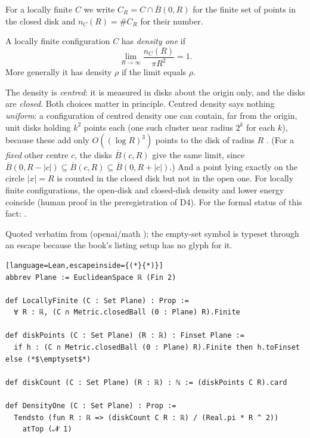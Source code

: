 For a locally finite $C$ we write $C_R = C\cap\overline B(0,R)$ for the finite set of points in the closed disk and
$n_C(R)=\#C_R$ for their number.

\begin{definition}\label{def:density}
A locally finite configuration $C$ has \emph{density one} if
\[
  \lim_{R\to\infty}\frac{n_C(R)}{\pi R^2}=1 .
\]
More generally it has density $\rho$ if the limit equals $\rho$.
\end{definition}

The density is \emph{centred}: it is measured in disks about the origin only, and the disks are \emph{closed}. Both
choices matter in principle. Centred density says nothing \emph{uniform}: a configuration of centred density one can
contain, far from the origin, unit disks holding $k^2$ points each (one such cluster near radius $2^k$ for each $k$),
because these add only $O((\log R)^3)$ points to the disk of radius $R$ \tierC{}. (For a \emph{fixed} other centre $c$,
the disks $\overline B(c,R)$ give the same limit, since
$\overline B(0,R-|c|)\subseteq\overline B(c,R)\subseteq\overline B(0,R+|c|)$.) And a point lying exactly on the circle $|x|=R$ is counted in the closed disk but not in the open
one. For locally finite configurations, the open-disk and closed-disk density and lower energy coincide
\tierC{} (human proof in the preregistration of D4). For the formal status of this fact: \DFourStatus.

\begin{leanbox}
Quoted verbatim from  (openai/math ); the
empty-set symbol is typeset through an escape because the book's listing setup has no glyph for it.
\begin{lstlisting}[language=Lean,escapeinside={(*}{*)}]
abbrev Plane := EuclideanSpace ℝ (Fin 2)

def LocallyFinite (C : Set Plane) : Prop :=
  ∀ R : ℝ, (C ∩ Metric.closedBall (0 : Plane) R).Finite

def diskPoints (C : Set Plane) (R : ℝ) : Finset Plane :=
  if h : (C ∩ Metric.closedBall (0 : Plane) R).Finite then h.toFinset else (*$\emptyset$*)

def diskCount (C : Set Plane) (R : ℝ) : ℕ := (diskPoints C R).card

def DensityOne (C : Set Plane) : Prop :=
  Tendsto (fun R : ℝ => (diskCount C R : ℝ) / (Real.pi * R ^ 2))
    atTop (𝓝 1)
\end{lstlisting}
\end{leanbox}

